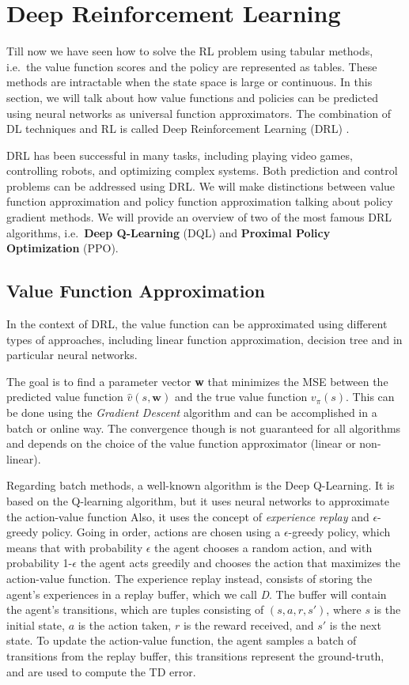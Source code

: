 \section{Deep Reinforcement Learning}
\label{sec:drl}
Till now we have seen how to solve the RL problem using tabular methods, i.e.\ the value function scores and the policy are represented as tables.
These methods are intractable when the state space is large or continuous.
In this section, we will talk about how value functions and policies can be predicted using neural networks as universal function approximators.
The combination of DL techniques and RL is called Deep Reinforcement Learning (DRL) \citep{mnih2015human}.

DRL has been successful in many tasks, including playing video games, controlling robots, and optimizing complex systems.
Both prediction and control problems can be addressed using DRL.
We will make distinctions between value function approximation and policy function approximation talking about policy gradient methods. 
We will provide an overview of two of the most famous DRL algorithms, i.e.\ \textbf{Deep Q-Learning} (DQL) and \textbf{Proximal Policy Optimization} (PPO).


\subsection{Value Function Approximation}
\label{subsec:value_function_approx}
In the context of DRL, the value function can be approximated using different types of approaches, including linear function approximation, decision tree and in particular neural networks.

The goal is to find a parameter vector \textbf{w} that minimizes the MSE between the predicted value function $\hat{v}(s,\textbf{w})$ and the true value function $v_\pi(s)$.
This can be done using the \textit{Gradient Descent} algorithm and can be accomplished in a batch or online way.
The convergence though is not guaranteed for all algorithms and depends on the choice of the value function approximator (linear or non-linear).

Regarding batch methods, a well-known algorithm is the Deep Q-Learning.
It is based on the Q-learning algorithm, but it uses neural networks to approximate the action-value function
Also, it uses the concept of \textit{experience replay} and $\epsilon$-greedy policy.
Going in order, actions are chosen using a $\epsilon$-greedy policy, which means that with probability $\epsilon$ the agent chooses a random action, and with probability 1-$\epsilon$ the agent acts greedily and chooses the action that maximizes the action-value function.
The experience replay instead, consists of storing the agent's experiences in a replay buffer, which we call \textit{D}.
The buffer will contain the agent's transitions, which are tuples consisting of $(s, a, r, s')$, where $s$ is the initial state, $a$ is the action taken, $r$ is the reward received, and $s'$ is the next state.
To update the action-value function, the agent samples a batch of transitions from the replay buffer, this transitions represent the ground-truth, and are used to compute the TD error.

